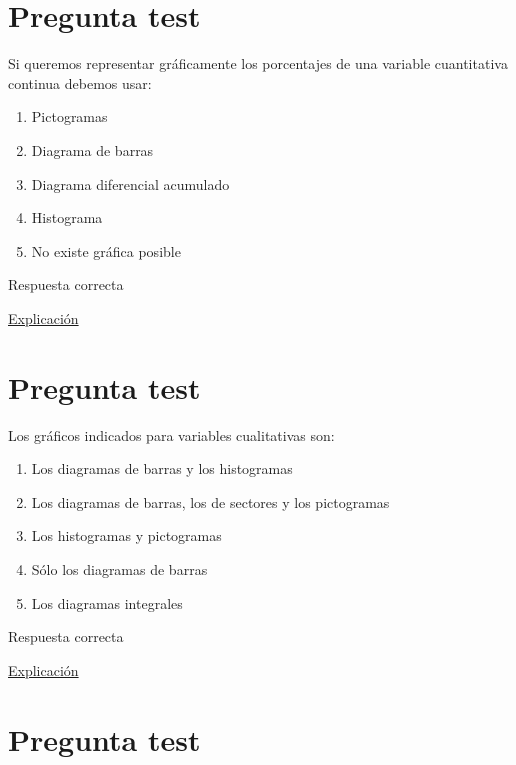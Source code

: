 \documentclass[
]{book}
\providecommand{\tightlist}{%
  \setlength{\itemsep}{0pt}\setlength{\parskip}{0pt}}
\begin{document}
\hypertarget{pregunta-test-58}{%
\section{Pregunta test}\label{pregunta-test-58}}

Si queremos representar gráficamente los porcentajes de una variable cuantitativa continua debemos usar:

\begin{enumerate}
\def\labelenumi{\alph{enumi})}
\tightlist
\item
  Pictogramas
\item
  Diagrama de barras
\item
  Diagrama diferencial acumulado
\item
  Histograma
\item
  No existe gráfica posible
\end{enumerate}

Respuesta correcta

\href{https://1fjmanzano.github.io/bioestadistica/histogramas.html}{Explicación}

\hypertarget{pregunta-test-59}{%
\section{Pregunta test}\label{pregunta-test-59}}

Los gráficos indicados para variables cualitativas son:

\begin{enumerate}
\def\labelenumi{\alph{enumi})}
\tightlist
\item
  Los diagramas de barras y los histogramas
\item
  Los diagramas de barras, los de sectores y los pictogramas
\item
  Los histogramas y pictogramas
\item
  Sólo los diagramas de barras
\item
  Los diagramas integrales
\end{enumerate}

Respuesta correcta

\href{https://1fjmanzano.github.io/bioestadistica/diagramas-de-barras-y-sectores.html}{Explicación}

\hypertarget{pregunta-test-60}{%
\section{Pregunta test}\label{pregunta-test-60}}
\end{document}
